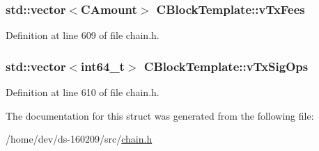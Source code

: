 \hypertarget{struct_c_block_template_a66287bde795cc8e8c8cb59c4e2302d49}{}
\subsubsection[{v\+Tx\+Fees}]{\setlength{\rightskip}{0pt plus 5cm}std\+::vector$<${\bf C\+Amount}$>$ C\+Block\+Template\+::v\+Tx\+Fees}\label{struct_c_block_template_a66287bde795cc8e8c8cb59c4e2302d49}


Definition at line 609 of file chain.\+h.

\hypertarget{struct_c_block_template_a13326eb92a7d2fc073d9f5660dfcdde5}{}
\subsubsection[{v\+Tx\+Sig\+Ops}]{\setlength{\rightskip}{0pt plus 5cm}std\+::vector$<${\bf int64\+\_\+t}$>$ C\+Block\+Template\+::v\+Tx\+Sig\+Ops}\label{struct_c_block_template_a13326eb92a7d2fc073d9f5660dfcdde5}


Definition at line 610 of file chain.\+h.



The documentation for this struct was generated from the following file\+:\begin{DoxyCompactItemize}
\item 
/home/dev/ds-\/160209/src/\hyperlink{chain_8h}{chain.\+h}\end{DoxyCompactItemize}
